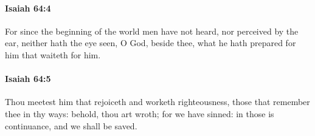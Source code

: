 		\paragraph{Isaiah 64:4} %
			\label{ISAIAH-64-4}

			For since the beginning of the world men have not heard, nor perceived by the ear, neither hath the eye seen, O God, beside thee, what he hath prepared for him that waiteth for him.


		\paragraph{Isaiah 64:5} %
			\label{ISAIAH-64-5}

			Thou meetest him that rejoiceth and worketh righteousness, those that remember thee in thy ways: behold, thou art wroth; for we have sinned: in those is continuance, and we shall be saved.


